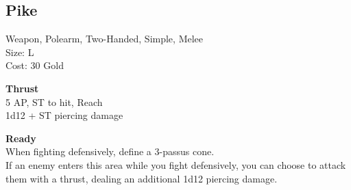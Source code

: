 \subsection{Pike}\label{weapon:pike}
Weapon, Polearm, Two-Handed, Simple, Melee\\
Size: L\\
Cost: 30 Gold

\textbf{Thrust}\\
5 AP, ST to hit,  Reach\\
1d12 + \texttimes ST piercing damage

\textbf{Ready}\\
When fighting defensively, define a 3-passus cone.\\
If an enemy enters this area while you fight defensively, you can choose to attack them with a thrust, dealing an additional 1d12 piercing damage.\\


